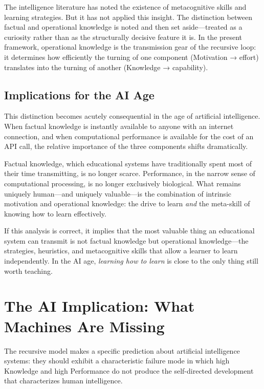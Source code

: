 \documentclass[12pt,a4paper]{article}
\begin{document}
The intelligence literature has noted the existence of metacognitive skills and learning strategies. But it has not applied this insight. The distinction between factual and operational knowledge is noted and then set aside---\hspace{0pt}treated as a curiosity rather than as the structurally decisive feature it is. In the present framework, operational knowledge is the transmission gear of the recursive loop: it determines how efficiently the turning of one component (Motivation → effort) translates into the turning of another (Knowledge → capability).

\subsection{Implications for the AI Age}

This distinction becomes acutely consequential in the age of artificial intelligence. When factual knowledge is instantly available to anyone with an internet connection, and when computational performance is available for the cost of an API call, the relative importance of the three components shifts dramatically.

Factual knowledge, which educational systems have traditionally spent most of their time transmitting, is no longer scarce. Performance, in the narrow sense of computational processing, is no longer exclusively biological. What remains uniquely human---\hspace{0pt}and uniquely valuable---\hspace{0pt}is the combination of intrinsic motivation and operational knowledge: the drive to learn \emph{and} the meta-skill of knowing how to learn effectively.

If this analysis is correct, it implies that the most valuable thing an educational system can transmit is not factual knowledge but operational knowledge---\hspace{0pt}the strategies, heuristics, and metacognitive skills that allow a learner to learn independently. In the AI age, \emph{learning how to learn} is close to the only thing still worth teaching.


\section{The AI Implication: What Machines Are Missing}

The recursive model makes a specific prediction about artificial intelligence systems: they should exhibit a characteristic failure mode in which high Knowledge and high Performance do not produce the self-directed development that characterizes human intelligence.
\end{document}
